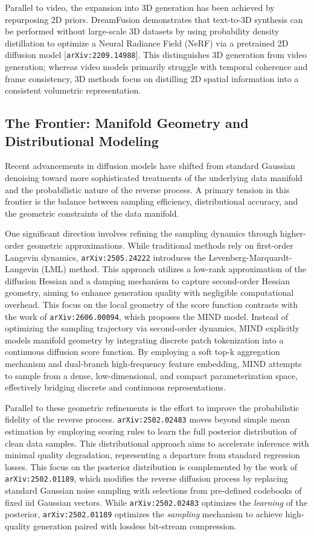 \documentclass[11pt]{article}
\begin{document}
Parallel to video, the expansion into 3D generation has been achieved by repurposing 2D priors. DreamFusion demonstrates that text-to-3D synthesis can be performed without large-scale 3D datasets by using probability density distillation to optimize a Neural Radiance Field (NeRF) via a pretrained 2D diffusion model [\texttt{arXiv:2209.14988}]. This distinguishes 3D generation from video generation; whereas video models primarily struggle with temporal coherence and frame consistency, 3D methods focus on distilling 2D spatial information into a consistent volumetric representation.

\subsection{The Frontier: Manifold Geometry and Distributional Modeling}

Recent advancements in diffusion models have shifted from standard Gaussian denoising toward more sophisticated treatments of the underlying data manifold and the probabilistic nature of the reverse process. A primary tension in this frontier is the balance between sampling efficiency, distributional accuracy, and the geometric constraints of the data manifold.

One significant direction involves refining the sampling dynamics through higher-order geometric approximations. While traditional methods rely on first-order Langevin dynamics, \texttt{arXiv:2505.24222} introduces the Levenberg-Marquardt-Langevin (LML) method. This approach utilizes a low-rank approximation of the diffusion Hessian and a damping mechanism to capture second-order Hessian geometry, aiming to enhance generation quality with negligible computational overhead. This focus on the local geometry of the score function contrasts with the work of \texttt{arXiv:2606.00094}, which proposes the MIND model. Instead of optimizing the sampling trajectory via second-order dynamics, MIND explicitly models manifold geometry by integrating discrete patch tokenization into a continuous diffusion score function. By employing a soft top-k aggregation mechanism and dual-branch high-frequency feature embedding, MIND attempts to sample from a dense, low-dimensional, and compact parameterization space, effectively bridging discrete and continuous representations.

Parallel to these geometric refinements is the effort to improve the probabilistic fidelity of the reverse process. \texttt{arXiv:2502.02483} moves beyond simple mean estimation by employing scoring rules to learn the full posterior distribution of clean data samples. This distributional approach aims to accelerate inference with minimal quality degradation, representing a departure from standard regression losses. This focus on the posterior distribution is complemented by the work of \texttt{arXiv:2502.01189}, which modifies the reverse diffusion process by replacing standard Gaussian noise sampling with selections from pre-defined codebooks of fixed iid Gaussian vectors. While \texttt{arXiv:2502.02483} optimizes the \textit{learning} of the posterior, \texttt{arXiv:2502.01189} optimizes the \textit{sampling} mechanism to achieve high-quality generation paired with lossless bit-stream compression.
\end{document}
